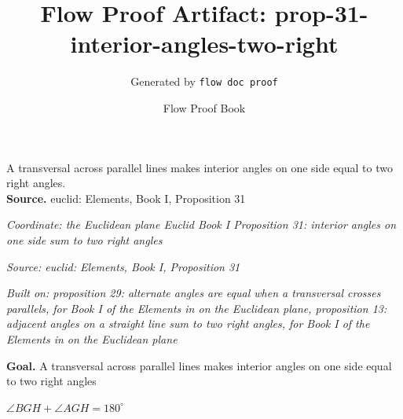 \documentclass[11pt]{article}
\title{Flow Proof Artifact: prop-31-interior-angles-two-right}
\author{Generated by \texttt{flow doc proof}}
\date{Flow Proof Book}
\theoremstyle{definition}
\begin{document}
\maketitle
A transversal across parallel lines makes interior angles on one side equal to two right angles.\\[0.5em]
\textbf{Source.} euclid: Elements, Book I, Proposition 31\\[0.5em]
\bigskip
{}\par
\smallskip\noindent\textit{Coordinate: the Euclidean plane \cdot Euclid Book I \cdot Proposition 31: interior angles on one side sum to two right angles}\par
\smallskip\noindent\textit{Source: euclid: Elements, Book I, Proposition 31}\par
\smallskip\noindent\textit{Built on: proposition 29: alternate angles are equal when a transversal crosses parallels, for Book I of the Elements in on the Euclidean plane, proposition 13: adjacent angles on a straight line sum to two right angles, for Book I of the Elements in on the Euclidean plane}\par
\medskip
\noindent\textbf{Goal.} A transversal across parallel lines makes interior angles on one side equal to two right angles\par
\noindent$\displaystyle \angle BGH + \angle AGH = 180^\circ$\par
\medskip
\noindent
\end{document}
